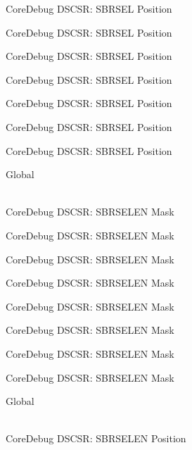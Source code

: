 \begin{DoxyRefList}
\label{deprecated__deprecated000149}%
%
Core\+Debug DSCSR\+: SBRSEL Position 

\label{deprecated__deprecated000225}%
%
Core\+Debug DSCSR\+: SBRSEL Position 

\label{deprecated__deprecated000288}%
%
Core\+Debug DSCSR\+: SBRSEL Position 

\label{deprecated__deprecated000367}%
%
Core\+Debug DSCSR\+: SBRSEL Position 

\label{deprecated__deprecated000443}%
%
Core\+Debug DSCSR\+: SBRSEL Position 

\label{deprecated__deprecated000546}%
%
Core\+Debug DSCSR\+: SBRSEL Position 

\label{deprecated__deprecated000648}%
%
Core\+Debug DSCSR\+: SBRSEL Position  
\item[{\parbox[t]{\linewidth}{Global \doxylink{group___c_m_s_i_s___s_c_b_ga5e5ed94cac1139165af161c008881805}{Core\+Debug\+\_\+\+DSCSR\+\_\+\+SBRSELEN\+\_\+\+Msk} }}]\hfill \\
\label{deprecated__deprecated000098}%
%
Core\+Debug DSCSR\+: SBRSELEN Mask 

\label{deprecated__deprecated000152}%
%
Core\+Debug DSCSR\+: SBRSELEN Mask 

\label{deprecated__deprecated000228}%
%
Core\+Debug DSCSR\+: SBRSELEN Mask 

\label{deprecated__deprecated000291}%
%
Core\+Debug DSCSR\+: SBRSELEN Mask 

\label{deprecated__deprecated000370}%
%
Core\+Debug DSCSR\+: SBRSELEN Mask 

\label{deprecated__deprecated000446}%
%
Core\+Debug DSCSR\+: SBRSELEN Mask 

\label{deprecated__deprecated000549}%
%
Core\+Debug DSCSR\+: SBRSELEN Mask 

\label{deprecated__deprecated000651}%
%
Core\+Debug DSCSR\+: SBRSELEN Mask  
\item[{\parbox[t]{\linewidth}{Global \doxylink{group___c_m_s_i_s___s_c_b_ga3eb88e444b678057db1b59272eebb1ad}{Core\+Debug\+\_\+\+DSCSR\+\_\+\+SBRSELEN\+\_\+\+Pos} }}]\hfill \\
\label{deprecated__deprecated000097}%
%
Core\+Debug DSCSR\+: SBRSELEN Position 


\end{DoxyRefList}
